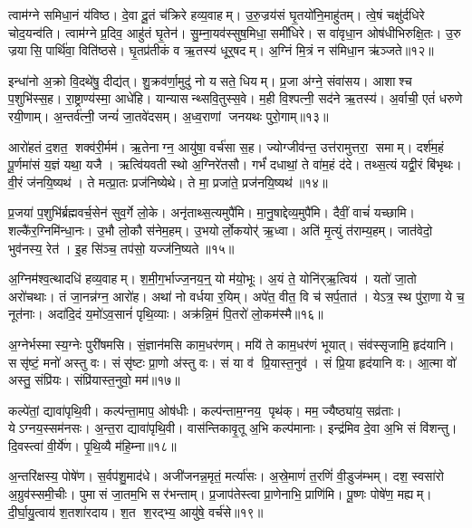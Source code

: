 त्वाम॑ग्ने समिधा॒नं य॑विष्ठ। दे॒वा दू॒तं च॑क्रिरे हव्य॒वाहम्। उ॒रु॒ज्रय॑सं घृ॒तयो॑नि॒माहु॑तम्। त्वे॒षं चक्षु॑र्दधिरे चोद॒यन्व॑ति। त्वाम॑ग्ने प्र॒दिव॒ आहु॑तं घृ॒तेन॑। सु॒म्ना॒यव॑स्सुष॒मिधा॒ समी॑धिरे। स वा॑वृधा॒न ओष॑धीभिरुक्षि॒तः। उ॒रु ज्रयासि॒ पार्थि॑वा॒ विति॑ष्ठसे। घृ॒तप्र॑तीकं व ऋ॒तस्य॑ धूर्॒षदम्। अ॒ग्निं मि॒त्रं न स॑मिधा॒न ऋ॑ञ्जते॥१२॥

इन्धा॑नो अ॒क्रो वि॒दथे॑षु॒ दीद्य॑त्। शु॒क्रव॑र्णा॒मुदु॑ नो यसते॒ धियम्। प्र॒जा अ॑ग्ने॒ संवा॑सय। आशाश्च प॒शुभि॑स्स॒ह। रा॒ष्ट्राण्य॑स्मा॒ आधे॑हि। यान्यासन्थ्सवि॒तुस्स॒वे। म॒ही वि॒श्पत्नी॒ सद॑ने ऋ॒तस्य॑। अ॒र्वाची॒ एतं॑ धरुणे रयी॒णाम्। अ॒न्तर्व॑त्नी॒ जन्यं॑ जा॒तवे॑दसम्। अ॒ध्व॒राणां जनयथः पुरो॒गाम्॥१३॥

आरो॑हतं द॒शत॒ शक्व॑री॒र्मम॑। ऋ॒तेनाग्न॒ आयु॑षा॒ वर्च॑सा स॒ह। ज्योग्जीव॑न्त॒ उत्त॑रामुत्तरा॒ समाम्। दर्\mbox{}श॑म॒हं पू॒र्णमा॑सं य॒ज्ञं यथा॒ यजै। ऋत्वि॑यवती स्थो अ॒ग्निरे॑तसौ। गर्भं॑ दधाथां॒ ते वा॑म॒हं द॑दे। तथ्स॒त्यं यद्वी॒रं बि॑भृथः। वी॒रं ज॑नयि॒ष्यथ॑। ते मत्प्रा॒तः प्रज॑निष्येथे। ते मा॒ प्रजा॑ते॒ प्रज॑नयि॒ष्यथ॑॥१४॥

प्र॒जया॑ प॒शुभि॑र्ब्रह्मवर्च॒सेन॑ सुव॒र्गे लो॒के। अनृ॑ताथ्स॒त्यमुपै॑मि। मा॒नु॒षाद्देव्य॒मुपै॑मि। दैवीं॒ वाचं॑ यच्छामि। शल्कै॑र॒ग्निमि॑न्धा॒नः। उ॒भौ लो॒कौ स॑नेम॒हम्। उ॒भयोर्लो॒कयोर्॑ ऋ॒ध्वा। अति॑ मृ॒त्युं त॑राम्य॒हम्। जात॑वेदो॒ भुव॑नस्य॒ रेत॑। इ॒ह सि॑ञ्च॒ तप॑सो॒ यज्ज॑नि॒ष्यते॥१५॥

अ॒ग्निम॑श्व॒त्थादधि॑ हव्य॒वाहम्। श॒मी॒ग॒र्भाज्ज॒नय॒न्॒ यो म॑यो॒भूः। अ॒यं ते॒ योनि॑र्‌ऋ॒त्विय॑। यतो॑ जा॒तो अरो॑चथाः। तं जा॒नन्न॑ग्न॒ आरो॑ह। अथा॑ नो वर्धया र॒यिम्। अपे॑त॒ वीत॒ वि च॑ सर्प॒तात॑। येऽत्र॒ स्थ पु॑रा॒णा ये च॒ नूत॑नाः। अदा॑दि॒दं य॒मो॑ऽव॒सानं॑ पृथि॒व्याः। अक्र॑न्नि॒मं पि॒तरो॑ लो॒कम॑स्मै॥१६॥

अ॒ग्नेर्भस्मास्य॒ग्नेः पुरी॑षमसि। सं॒ज्ञान॑मसि काम॒धर॑णम्। मयि॑ ते काम॒धर॑णं भूयात्। संव॑स्सृजामि॒ हृद॑यानि। ससृ॑ष्टं॒ मनो॑ अस्तु वः। संसृ॑ष्टः प्रा॒णो अ॑स्तु वः। सं या व॑ प्रि॒यास्त॒नुव॑। सं प्रि॒या हृद॑यानि वः। आ॒त्मा वो॑ अस्तु॒ संप्रि॑यः। संप्रि॑यास्त॒नुवो॒ मम॑॥१७॥

कल्पे॑तां॒ द्यावा॑पृथि॒वी। कल्प॑न्ता॒माप॒ ओष॑धीः। कल्प॑न्ताम॒ग्नय॒ पृथ॑क्। मम॒ ज्यैष्ठ्या॑य॒ सव्र॑ताः। येऽग्नय॒स्सम॑नसः। अ॒न्त॒रा द्यावा॑पृथि॒वी। वास॑न्तिकावृ॒तू अ॒भि कल्प॑मानाः। इन्द्र॑मिव दे॒वा अ॒भि सं वि॑शन्तु। दि॒वस्त्वा॑ वी॒र्ये॑ण। पृ॒थि॒व्यै म॑हि॒म्ना॥१८॥

अ॒न्तरि॑क्षस्य॒ पोषे॑ण। स॒र्वप॑शु॒माद॑धे। अजी॑जनन्न॒मृतं॒ मर्त्या॑सः। अ॒स्रे॒माणं॑ त॒रणिं॑ वी॒डुज॑म्भम्। दश॒ स्वसा॑रो अ॒ग्रुव॑स्समी॒चीः। पुमासं जा॒तम॒भि सर॑भन्ताम्। प्र॒जाप॑तेस्त्वा प्रा॒णेनाभि॒ प्राणि॑मि। पू॒ष्णः पोषे॑ण॒ मह्यम्। दी॒र्घा॒यु॒त्वाय॑ श॒तशा॑रदाय। श॒त श॒रद्भ्य॒ आयु॑षे॒ वर्च॑से॥१९॥

